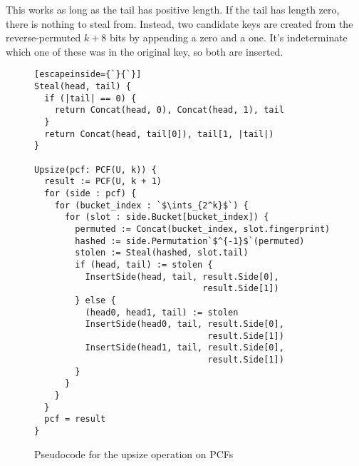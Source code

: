 \documentclass[letterpaper, 11pt]{article}
\newcommand{\ints}{\mathbb{Z}}
\begin{document}
This works as long as the tail has positive length.
If the tail has length zero, there is nothing to steal from.
Instead, two candidate keys are created from the reverse-permuted $k+8$ bits by appending a zero and a one.
It's indeterminate which one of these was in the original key, so both are inserted.

\begin{figure}
\begin{lstlisting}[escapeinside={`}{`}]
Steal(head, tail) {
  if (|tail| == 0) {
    return Concat(head, 0), Concat(head, 1), tail
  }
  return Concat(head, tail[0]), tail[1, |tail|)
}

Upsize(pcf: PCF(U, k)) {
  result := PCF(U, k + 1)
  for (side : pcf) {
    for (bucket_index : `$\ints_{2^k}$`) {
      for (slot : side.Bucket[bucket_index]) {
        permuted := Concat(bucket_index, slot.fingerprint)
        hashed := side.Permutation`$^{-1}$`(permuted)
        stolen := Steal(hashed, slot.tail)
        if (head, tail) := stolen {
          InsertSide(head, tail, result.Side[0],
                                 result.Side[1])
        } else {
          (head0, head1, tail) := stolen
          InsertSide(head0, tail, result.Side[0],
                                  result.Side[1])
          InsertSide(head1, tail, result.Side[0],
                                  result.Side[1])
        }
      }
    }
  }
  pcf = result
}
\end{lstlisting}
\caption{Pseudocode for the upsize operation on PCFs}
\end{figure}


\end{document}
